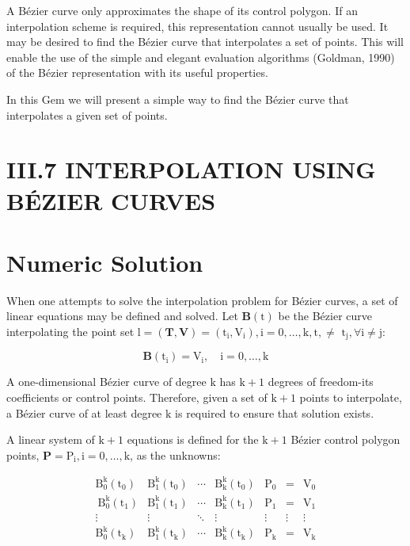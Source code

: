 A Bézier curve only approximates the shape of its control polygon. If an interpolation scheme is required, this representation cannot usually be used. It may be desired to find the Bézier curve that interpolates a set of points. This will enable the use of the simple and elegant evaluation algorithms (Goldman, 1990) of the Bézier representation with its useful properties.

In this Gem we will present a simple way to find the Bézier curve that interpolates a given set of points.

\section{III.7 INTERPOLATION USING BÉZIER CURVES}
\section{Numeric Solution}
When one attempts to solve the interpolation problem for Bézier curves, a set of linear equations may be defined and solved. Let $\mathbf{B}(\mathrm{t})$ be the Bézier curve interpolating the point set $\mathrm{l}=(\mathbf{T}, \mathbf{V})=\left(\mathrm{t}_{\mathrm{i}}, \mathrm{V}_{\mathrm{i}}\right), \mathrm{i}=0, \ldots, \mathrm{k}, \mathrm{t}, \neq$ $\mathrm{t}_{\mathrm{j}}, \forall \mathrm{i} \neq \mathrm{j}:$

$$
\mathbf{B}\left(\mathrm{t}_{\mathrm{i}}\right)=\mathrm{V}_{\mathrm{i}}, \quad \mathrm{i}=0, \ldots, \mathrm{k}
$$

A one-dimensional Bézier curve of degree $\mathrm{k}$ has $\mathrm{k}+1$ degrees of freedom-its coefficients or control points. Therefore, given a set of $\mathrm{k}+1$ points to interpolate, a Bézier curve of at least degree $\mathrm{k}$ is required to ensure that solution exists.

A linear system of $\mathrm{k}+1$ equations is defined for the $\mathrm{k}+1$ Bézier control polygon points, $\mathbf{P}=\mathrm{P}_{\mathrm{i}}, \mathrm{i}=0, \ldots, \mathrm{k}$, as the unknowns:

$$
\begin{array}{ccccccc}
\mathrm{B}_{0}^{\mathrm{k}}\left(\mathrm{t}_{0}\right) & \mathrm{B}_{1}^{\mathrm{k}}\left(\mathrm{t}_{0}\right) & \cdots & \mathrm{B}_{\mathrm{k}}^{\mathrm{k}}\left(\mathrm{t}_{0}\right) & \mathrm{P}_{0} & = & \mathrm{V}_{0} \\
\mathrm{~B}_{0}^{\mathrm{k}}\left(\mathrm{t}_{1}\right) & \mathrm{B}_{1}^{\mathrm{k}}\left(\mathrm{t}_{1}\right) & \cdots & \mathrm{B}_{\mathrm{k}}^{\mathrm{k}}\left(\mathrm{t}_{1}\right) & \mathrm{P}_{1} & = & \mathrm{V}_{1} \\
\vdots & \vdots & \ddots & \vdots & \vdots & \vdots & \vdots \\
\mathrm{B}_{0}^{\mathrm{k}}\left(\mathrm{t}_{\mathrm{k}}\right) & \mathrm{B}_{1}^{\mathrm{k}}\left(\mathrm{t}_{\mathrm{k}}\right) & \cdots & \mathrm{B}_{\mathrm{k}}^{\mathrm{k}}\left(\mathrm{t}_{\mathrm{k}}\right) & \mathrm{P}_{\mathrm{k}} & = & \mathrm{V}_{\mathrm{k}}
\end{array}
$$

